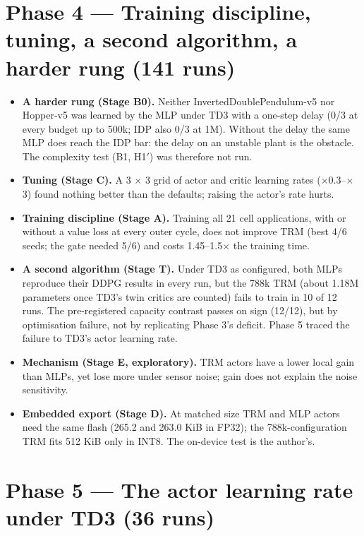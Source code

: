 \documentclass[11pt]{article}
\begin{document}
\section*{Phase 4 --- Training discipline, tuning, a second algorithm, a harder rung (141 runs)}



\begin{itemize}
\item \textbf{A harder rung (Stage B0).} Neither InvertedDoublePendulum-v5 nor Hopper-v5 was learned by the MLP under TD3 with a one-step delay (0/3 at every budget up to 500k; IDP also 0/3 at 1M). Without the delay the same MLP does reach the IDP bar: the delay on an unstable plant is the obstacle. The complexity test (B1, H1$'$) was therefore not run.
\item \textbf{Tuning (Stage C).} A 3 $\times$ 3 grid of actor and critic learning rates ($\times$0.3--$\times$3) found nothing better than the defaults; raising the actor's rate hurts.
\item \textbf{Training discipline (Stage A).} Training all 21 cell applications, with or without a value loss at every outer cycle, does not improve TRM (best 4/6 seeds; the gate needed 5/6) and costs 1.45--1.5$\times$ the training time.
\item \textbf{A second algorithm (Stage T).} Under TD3 as configured, both MLPs reproduce their DDPG results in every run, but the 788k TRM (about 1.18M parameters once TD3's twin critics are counted) fails to train in 10 of 12 runs. The pre-registered capacity contrast passes on sign (12/12), but by optimisation failure, not by replicating Phase 3's deficit. Phase 5 traced the failure to TD3's actor learning rate.
\item \textbf{Mechanism (Stage E, exploratory).} TRM actors have a lower local gain than MLPs, yet lose more under sensor noise; gain does not explain the noise sensitivity.
\item \textbf{Embedded export (Stage D).} At matched size TRM and MLP actors need the same flash (265.2 and 263.0 KiB in FP32); the 788k-configuration TRM fits 512 KiB only in INT8. The on-device test is the author's.
\end{itemize}



\section*{Phase 5 --- The actor learning rate under TD3 (36 runs)}
\end{document}
